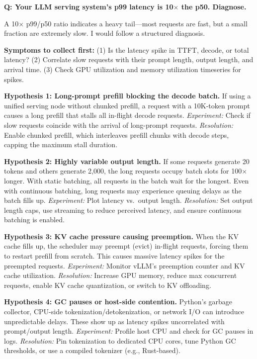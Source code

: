 \begin{interviewq}
\textbf{Q: Your LLM serving system's p99 latency is 10$\times$ the p50. Diagnose.}

 \quad {} \quad \badgefreq{\freqmed}

\stronganswer

A 10$\times$ p99/p50 ratio indicates a heavy tail---most requests are fast, but a small fraction are extremely slow. I would follow a structured diagnosis.

\textbf{Symptoms to collect first:} (1) Is the latency spike in TTFT, decode, or total latency? (2) Correlate slow requests with their prompt length, output length, and arrival time. (3) Check GPU utilization and memory utilization timeseries for spikes.

\textbf{Hypothesis 1: Long-prompt prefill blocking the decode batch.} If using a unified serving node without chunked prefill, a request with a 10K-token prompt causes a long prefill that stalls all in-flight decode requests. \textit{Experiment:} Check if slow requests coincide with the arrival of long-prompt requests. \textit{Resolution:} Enable chunked prefill, which interleaves prefill chunks with decode steps, capping the maximum stall duration.

\textbf{Hypothesis 2: Highly variable output length.} If some requests generate 20 tokens and others generate 2,000, the long requests occupy batch slots for 100$\times$ longer. With static batching, all requests in the batch wait for the longest. Even with continuous batching, long requests may experience queuing delays as the batch fills up. \textit{Experiment:} Plot latency vs.\ output length. \textit{Resolution:} Set output length caps, use streaming to reduce perceived latency, and ensure continuous batching is enabled.

\textbf{Hypothesis 3: KV cache pressure causing preemption.} When the KV cache fills up, the scheduler may preempt (evict) in-flight requests, forcing them to restart prefill from scratch. This causes massive latency spikes for the preempted requests. \textit{Experiment:} Monitor vLLM's preemption counter and KV cache utilization. \textit{Resolution:} Increase GPU memory, reduce max concurrent requests, enable KV cache quantization, or switch to KV offloading.

\textbf{Hypothesis 4: GC pauses or host-side contention.} Python's garbage collector, CPU-side tokenization/detokenization, or network I/O can introduce unpredictable delays. These show up as latency spikes uncorrelated with prompt/output length. \textit{Experiment:} Profile host CPU and check for GC pauses in logs. \textit{Resolution:} Pin tokenization to dedicated CPU cores, tune Python GC thresholds, or use a compiled tokenizer (e.g., Rust-based).


\end{interviewq}
